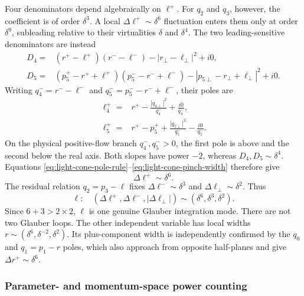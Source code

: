 \documentclass[a4paper,11pt]{article}
\begin{document}
Four denominators depend algebraically on \(\ell^+\).  For \(q_2\) and
\(q_3\), however, the coefficient is of order \(\delta^3\).  A local
\(\Delta\ell^+\sim\delta^6\) fluctuation enters them only at order
\(\delta^9\), subleading relative to their virtualities \(\delta\) and
\(\delta^4\).  The two leading-sensitive denominators are instead
\begin{align}
 D_4={}&(r^+-\ell^+)(r^--\ell^-)
       -|r_\perp-\ell_\perp|^2+i0,
 \label{eq:five-mrk-D4}\\
 D_5={}&(p_5^+-r^++\ell^+)(p_5^--r^-+\ell^-)
       -|p_{5\perp}-r_\perp+\ell_\perp|^2+i0.
 \label{eq:five-mrk-D5}
\end{align}
Writing \(q_4^-=r^--\ell^-\) and
\(q_5^-=p_5^--r^-+\ell^-\), their poles are
\begin{align}
 \ell_4^+={}&r^+-\frac{|q_{4\perp}|^2}{q_4^-}
              +\frac{i0}{q_4^-},
 \label{eq:five-mrk-pole4}\\
 \ell_5^+={}&r^+-p_5^++\frac{|q_{5\perp}|^2}{q_5^-}
              -\frac{i0}{q_5^-}.
 \label{eq:five-mrk-pole5}
\end{align}
On the physical positive-flow branch \(q_4^-,q_5^->0\), the first pole is
above and the second below the real axis.  Both slopes have power \(-2\),
whereas \(D_4,D_5\sim\delta^4\).  Equations
\eqref{eq:light-cone-pole-rule}--\eqref{eq:light-cone-pinch-width} therefore
give
\begin{equation}
 \Delta\ell^+\sim\delta^6.
 \label{eq:five-mrk-ellplus-width}
\end{equation}
The residual relation \(q_2=p_3-\ell\) fixes
\(\Delta\ell^-\sim\delta^3\) and
\(\Delta\ell_\perp\sim\delta^2\).  Thus
\begin{equation}
 \ell:\quad (\Delta\ell^+,\Delta\ell^-,
                   |\Delta\ell_\perp|)
       \sim(\delta^6,\delta^3,\delta^2).
 \label{eq:five-mrk-glauber-widths}
\end{equation}
Since \(6+3>2\times2\), \(\ell\) is one genuine Glauber integration mode.
There are not two Glauber loops.  The other independent variable has local
widths \(r\sim(\delta^6,\delta^{-2},\delta^2)\).  Its plus-component width
is independently confirmed by the \(q_0\) and \(q_1=p_1-r\) poles, which
also approach from opposite half-planes and give
\(\Delta r^+\sim\delta^6\).

\subsubsection*{Parameter- and momentum-space power counting}
\end{document}
